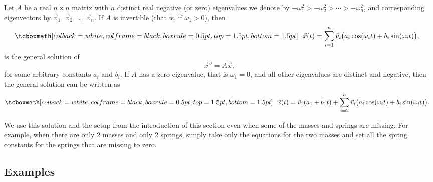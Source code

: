 \begin{theorem}
Let $A$ be a real $n \times n$ matrix
with $n$ distinct real negative (or zero) eigenvalues we
denote by $-\omega_1^2 > -\omega_2^2 > \cdots > -\omega_n^2$, and
corresponding
eigenvectors by
$\vec{v}_1$, $\vec{v}_2$, \ldots, $\vec{v}_n$.  If $A$ is invertible
(that is, if $\omega_1 > 0$), then
\begin{equation*}
\mybxbg{~~
\vec{x}(t)
= \sum_{i=1}^n \vec{v}_i \bigl(a_i \cos (\omega_i t) + b_i \sin (\omega_i t) \bigr) ,
~~}
\end{equation*}
is the general solution of
\begin{equation*}
{\vec{x}}'' = A \vec{x},
\end{equation*}
for some arbitrary constants $a_i$ and $b_i$.
If $A$ has a zero eigenvalue, that is $\omega_1 = 0$,
and all other eigenvalues are distinct and
negative, then the general solution can be written as
\begin{equation*}
\mybxbg{~~
\vec{x}(t) = \vec{v}_1 (a_1 + b_1 t) +
\sum_{i=2}^n \vec{v}_i \bigl(a_i \cos (\omega_i t) + b_i \sin (\omega_i t) \bigr) .
~~}
\end{equation*}
\end{theorem}

We use this solution and the setup from the introduction
of this section even when some of the masses and springs are missing.  
For example, when there are only 2 masses and only 2 springs, simply take
only the equations for
the two masses and set all the spring constants for the springs that
are missing to zero.

\subsection{Examples}

